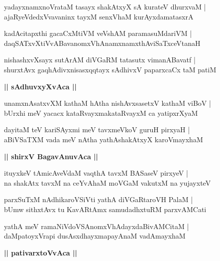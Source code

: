 \documentclass[twoside,12pt,openright]{book}
\newcounter{shloka}[chapter]
\def\uvaca#1{\centerline{{\large\textbf{#1}}}}
\begin{document}
\begin{shloka}%
yadayxnamxnoVrataM tasayx shakAtxyX sA kurateV dhurxvaM |\\
ajaRyeVdedxVvavaninx tayxM senxVhaM kurAyxdamatasxrA 
\end{shloka}

\begin{shloka}%
kadAcitapxthi gacaCxMtiVM veVshAM paramasuMdariVM |\\
daqSATxvXtiVvABavanomxVhAnamxnamxthAviSaTxceVtanaH 
\end{shloka}

\begin{shloka}%
nishashxvXsayx sutArAM diVGaRM tatasutx vimanABavatf |\\
shurxtAvx gaqhAdivxnisasxqqtayx sAdhivxV paparxcaCx taM patiM 
\end{shloka}

\uvaca{|| sAdhuvxyXvAca ||}

\begin{shloka}%
unamxnAsatxvXM kathaM hAtha nishAvxsasetxV kathaM viBoV |\\
bUrxhi meV yacacx kataRvayxmakataRvayxM ca yatipxrXyaM 
\end{shloka}

\begin{shloka}%
dayitaM teV kariSAyxmi meV tavxmeVkoV guruH pirxyaH |\\
aBiVSaTXM vada meV nAtha yathAshakAtxyX karoVmayxhaM
\end{shloka}

\uvaca{|| shirxV BagavAnuvAca ||}

\begin{shloka}%
ituyxkeV tAmicAveVdaM vaqthA tavxM BASaseV pirxyeV |\\
na shakAtx tavxM na ceYvAhaM moVGaM vakutxM na yujayxteV 
\end{shloka}

\begin{shloka}%
parxSuTxM nAdhikaroVSiVti yathA diVGaRtaroVH PalaM |\\
bUmw sithxtAvx tu KavARtAmx samudadhxtuRM parxvAMCati
\end{shloka}

\begin{shloka}%
yathA meV ramaNiVdoVSAnomxVhAdayxdaBivAMCitaM |\\
daMpatoyxVrapi dusAsxdhayxmapayAnaM vadAmayxhaM 
\end{shloka}

\uvaca{|| pativarxtoVvAca ||}
\end{document}
